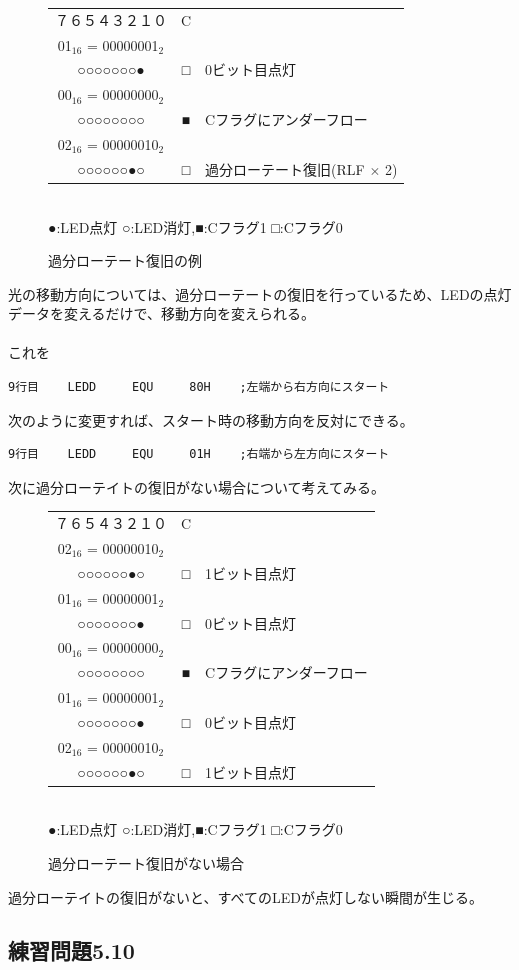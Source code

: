 \documentclass[a4paper,12pt]{ujarticle}
\begin{document}
   \begin{figure}[htbp]
    \begin{center}
      \begin{tabular}{ccl}
      ７６５４３２１０ & C  & \\
      {01}$_{16}$ = 00000001$_2$ \\
      ○○○○○○○● & □ & 0ビット目点灯 \\
      {00}$_{16}$ = 00000000$_2$ \\
      ○○○○○○○○ & ■ & Cフラグにアンダーフロー \\
      {02}$_{16}$ = 00000010$_2$ \\
      ○○○○○○●○ & □ & 過分ローテート復旧(RLF $\times$ 2) \\
      \end{tabular}\\
     ●:LED点灯 ○:LED消灯,■:Cフラグ1 □:Cフラグ0
     \caption{過分ローテート復旧の例}
     \label{fig:under}
    \end{center}
   \end{figure}
   光の移動方向については、過分ローテートの復旧を行っているため、LEDの点灯データを変えるだけで、移動方向を変えられる。\\
   \\
   これを
   \begin{lstlisting}[basicstyle=\ttfamily\footnotesize, frame=single]
9行目    LEDD     EQU     80H    ;左端から右方向にスタート
   \end{lstlisting}
   次のように変更すれば、スタート時の移動方向を反対にできる。
   \begin{lstlisting}[basicstyle=\ttfamily\footnotesize, frame=single]
9行目    LEDD     EQU     01H    ;右端から左方向にスタート
   \end{lstlisting}

   次に過分ローテイトの復旧がない場合について考えてみる。
    \begin{figure}[htbp]
     \begin{center}
      \begin{tabular}{ccl}
       ７６５４３２１０ & C  & \\
       {02}$_{16}$ = 00000010$_2$ \\
       ○○○○○○●○ & □ & 1ビット目点灯 \\
       {01}$_{16}$ = 00000001$_2$ \\
       ○○○○○○○● & □ & 0ビット目点灯 \\
       {00}$_{16}$ = 00000000$_2$ \\
       ○○○○○○○○ & ■ & Cフラグにアンダーフロー \\
       {01}$_{16}$ = 00000001$_2$ \\
       ○○○○○○○● & □ & 0ビット目点灯 \\
       {02}$_{16}$ = 00000010$_2$ \\
       ○○○○○○●○ & □ & 1ビット目点灯 \\
      \end{tabular}\\
      ●:LED点灯 ○:LED消灯,■:Cフラグ1 □:Cフラグ0
      \caption{過分ローテート復旧がない場合}
      \label{fig:under}
     \end{center}
    \end{figure}
  過分ローテイトの復旧がないと、すべてのLEDが点灯しない瞬間が生じる。
  \subsection{練習問題5.10}
  \clearpage
\end{document}
